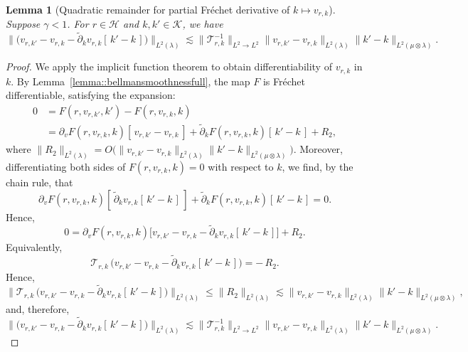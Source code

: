 \documentclass[11pt]{article}
\newcommand{\adk}{\widetilde{\partial}_k}
\theoremstyle{plain}
\newtheorem{lemma}[theorem]{Lemma}
\begin{document}
 
 
 
\begin{lemma}[Quadratic remainder for partial Fréchet derivative of $k \mapsto v_{r,k}$]
 \label{lemma::valuefirstderivativeexpansion::kernel}
 Suppose $\gamma < 1$. For $r \in \mathcal{H}$ and $k, k' \in \mathcal{K}$, we have
$$  \|\big(v_{r,k'} - v_{r,k} - \adk v_{r,k}[\,k' - k\,]\big)\|_{L^2(\lambda)}  \lesssim \|\mathcal{T}_{r,k}^{-1}\|_{L^2 \rightarrow L^2} \|v_{r,k'} - v_{r,k}\|_{L^2(\lambda)} \|k' - k\|_{L^2(\mu \otimes \lambda)}.$$
\end{lemma}
\begin{proof}

We apply the implicit function theorem to obtain differentiability of $v_{r,k}$ in $k$. By Lemma~\ref{lemma::bellmansmoothnessfull}, the map $F$ is Fr\'echet differentiable, satisfying the expansion:
\begin{align*}
0 
&= F(r, v_{r,k'}, k') - F(r, v_{r,k}, k) \\
&= \partial_v F(r, v_{r,k}, k)[\,v_{r,k'} - v_{r,k}\,] 
  + \adk F(r, v_{r,k}, k)[\,k' - k\,] + R_2,
\end{align*}
where $\|R_2\|_{L^2(\lambda)} = O\!\big(\|v_{r,k'} - v_{r,k}\|_{L^2(\lambda)} \|k' - k\|_{L^2(\mu \otimes \lambda)}\big)$.
Moreover, differentiating both sides of $F(r, v_{r,k}, k) = 0$ with respect to $k$, we find, by the chain rule, that
\[
\partial_v F(r,v_{r,k},k)[\,\adk v_{r,k}[\,k' - k\,]\,] + \adk F(r,v_{r,k},k)[\,k' - k\,]  
= 0.
\]
Hence,
\[
0 
= \partial_v F(r, v_{r,k}, k)\big[v_{r,k'} - v_{r,k} - \adk v_{r,k}[\,k' - k\,]\big] 
   + R_2.
\]
Equivalently,
\[
\mathcal{T}_{r,k}\,\big(v_{r,k'} - v_{r,k} - \adk v_{r,k}[\,k' - k\,]\big) = -\,R_2.
\]
Hence,
$$\| \mathcal{T}_{r,k}\,\big(v_{r,k'} - v_{r,k} - \adk v_{r,k}[\,k' - k\,]\big)\|_{L^2(\lambda)} \leq \|R_2\|_{L^2(\lambda)} \lesssim \|v_{r,k'} - v_{r,k}\|_{L^2(\lambda)} \|k' - k\|_{L^2(\mu \otimes \lambda)},$$
and, therefore,
$$  \|\big(v_{r,k'} - v_{r,k} - \adk v_{r,k}[\,k' - k\,]\big)\|_{L^2(\lambda)}  \lesssim \|\mathcal{T}_{r,k}^{-1}\|_{L^2 \rightarrow L^2} \|v_{r,k'} - v_{r,k}\|_{L^2(\lambda)} \|k' - k\|_{L^2(\mu \otimes \lambda)}.$$


 
 



\end{proof}
 
\end{document}
